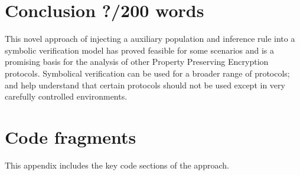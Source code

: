 \documentclass[journal]{IEEEtran}
\begin{document}
\section{Conclusion ?/200 words}
This novel approach of injecting a auxiliary population and inference rule into a symbolic verification model has proved feasible for some scenarios and is a promising basis for the analysis of other Property Preserving Encryption protocols. 	Symbolical verification can be used for a broader range of protocols; and help understand that certain protocols should not be used except in very carefully controlled environments.



%


\appendices

\section{\tamarin{} Code fragments}
This appendix includes the key code sections of the  approach.




%
\end{document}
